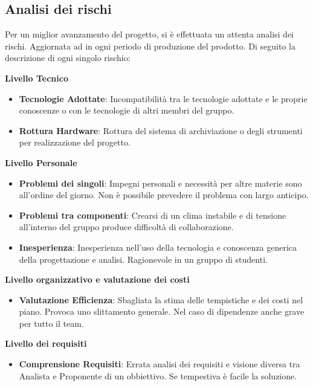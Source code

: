 \documentclass[12pt,a4paper,titlepage]{article}
\begin{document}
	\subsection{Analisi dei rischi}
		Per un miglior avanzamento del progetto, si è effettuata un attenta analisi dei rischi. Aggiornata ad in ogni periodo di produzione del prodotto.
		Di seguito la descrizione di ogni singolo rischio:\\
		\begin{center}
			\textbf{Livello Tecnico}
		\end{center}
		\begin{itemize}
			\item \textbf{Tecnologie Adottate}: Incompatibilità tra le tecnologie adottate e le proprie conoscenze o con le tecnologie di altri membri del gruppo.
			\item \textbf{Rottura Hardware}: Rottura del sistema di archiviazione o degli strumenti per realizzazione del progetto.
		\end{itemize}
		\begin{center}
			\textbf{Livello Personale}
		\end{center}
		\begin{itemize}
			\item \textbf{Problemi dei singoli}: Impegni personali e necessità per altre materie sono all'ordine del giorno. Non è possibile prevedere il problema con largo anticipo.
			\item \textbf{Problemi tra componenti}: Crearsi di un clima instabile e di tensione all'interno del gruppo produce difficoltà di collaborazione.
			\item \textbf{Inesperienza}: Inesperienza nell'uso della tecnologia e conoscenza generica della progettazione e analisi. Ragionevole in un gruppo di studenti.
		\end{itemize}
		\begin{center}
			\textbf{Livello organizzativo e valutazione dei costi}
		\end{center}
		\begin{itemize}
			\item \textbf{Valutazione Efficienza}: Sbagliata la stima delle tempistiche e dei costi nel piano. Provoca uno slittamento generale. Nel caso di dipendenze anche grave per tutto il team.
		\end{itemize}
		\begin{center}
			\textbf{Livello dei requisiti}
		\end{center}
		\begin{itemize}
			\item \textbf{Comprensione Requisiti}: Errata analisi dei requisiti e visione diversa tra Analista e Proponente di un obbiettivo. Se tempestiva è facile la soluzione.
		\end{itemize}
\end{document}
